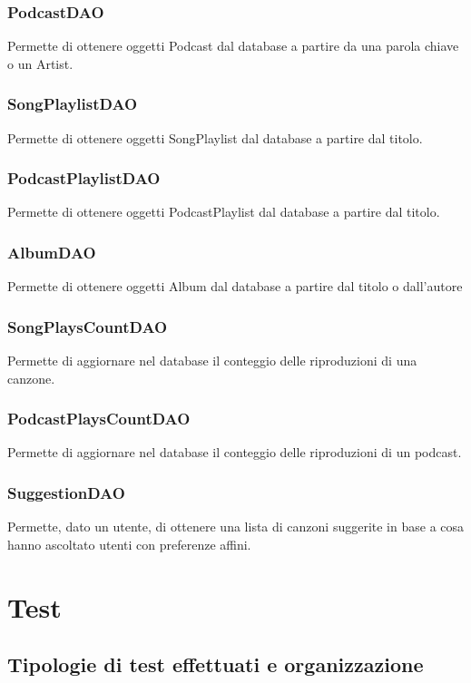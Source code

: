 \documentclass{article}
\begin{document}
  \subsubsection{PodcastDAO}
  Permette di ottenere oggetti Podcast dal database a partire da una parola chiave o un Artist.

  \subsubsection{SongPlaylistDAO}
  Permette di ottenere oggetti SongPlaylist dal database a partire dal titolo.

  \subsubsection{PodcastPlaylistDAO}
  Permette di ottenere oggetti PodcastPlaylist dal database a partire dal titolo.

  \subsubsection{AlbumDAO}
  Permette di ottenere oggetti Album dal database a partire dal titolo o dall'autore

  \subsubsection{SongPlaysCountDAO}
  Permette di aggiornare nel database il conteggio delle riproduzioni di una canzone.

  \subsubsection{PodcastPlaysCountDAO}
  Permette di aggiornare nel database il conteggio delle riproduzioni di un podcast.

  \subsubsection{SuggestionDAO}
  Permette, dato un utente, di ottenere una lista di canzoni suggerite in base a cosa hanno ascoltato utenti con preferenze affini.


  \section{Test}

  \subsection{Tipologie di test effettuati e organizzazione}
\end{document}

